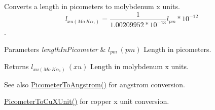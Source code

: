 Converts a length in picometers to molybdenum x units. \[ l_{xu(Mo\ K\alpha_1)}=\frac{1}{1.00209952*10^{-13}} l_{pm} * 10^{-12}\]. 


\begin{DoxyParams}{Parameters}
{\em length\+In\+Picometer} & $ l_{pm}\ (pm)$ Length in picometers. \\
\hline
\end{DoxyParams}
\begin{DoxyReturn}{Returns}
$ l_{xu(Mo\ K\alpha_1)}\ (xu)$ Length in molybdenum x units. 
\end{DoxyReturn}
\begin{DoxySeeAlso}{See also}
\mbox{\hyperlink{group___e_g_x_math-_conversions-_length_conversions-_s_i-_picometer-_non-_s_i_ga0b1b4a3ec4ea0110477f4547025d2719}{Picometer\+To\+Angstrom()}} for angstrom conversion. 

\mbox{\hyperlink{group___e_g_x_math-_conversions-_length_conversions-_s_i-_picometer-_non-_s_i_gab393c0c7c90ba14ff56f8eac343524ff}{Picometer\+To\+Cu\+X\+Unit()}} for copper x unit conversion. 
\end{DoxySeeAlso}

